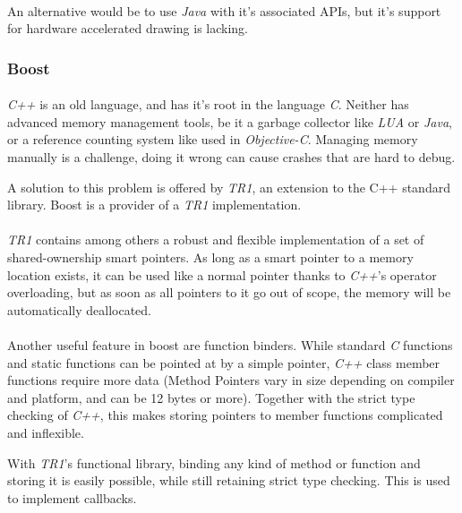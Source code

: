 \paragraph{}
An alternative would be to use \textit{Java} with it's associated APIs, but it's support for hardware accelerated drawing is lacking.


\subsubsection{Boost\label{FrameworkBoost}}
\paragraph{}
\textit{C++} is an old language, and has it's root in the language \textit{C}.
Neither has advanced memory management tools, be it a garbage collector like \textit{LUA} or \textit{Java}, or a reference counting system like used in \textit{Objective-C}.
Managing memory manually is a challenge, doing it wrong can cause crashes that are hard to debug.

A solution to this problem is offered by \textit{TR1}, an extension to the C++ standard library.
Boost\cite{boost} is a provider of a \textit{TR1} implementation.

\paragraph{}
\textit{TR1} contains among others a robust and flexible implementation of a set of shared-ownership smart pointers.
As long as a smart pointer to a memory location exists, it can be used like a normal pointer thanks to \textit{C++}'s operator overloading,
but as soon as all pointers to it go out of scope, the memory will be automatically deallocated.

\paragraph{}
Another useful feature in boost are function binders.
While standard \textit{C} functions and static functions can be pointed at by a simple pointer,
\textit{C++} class member functions require more data
(Method Pointers vary in size depending on compiler and platform, and can be 12 bytes or more).
Together with the strict type checking of \textit{C++}, this makes storing pointers to member functions complicated and inflexible.

With \textit{TR1}'s functional library, binding any kind of method or function and storing it is easily possible, while still retaining strict type checking.
This is used to implement callbacks.


